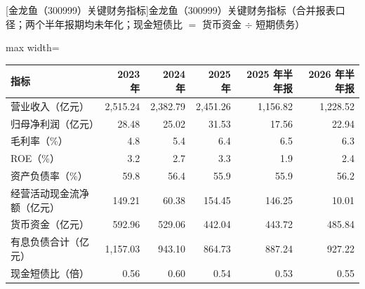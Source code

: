 \begin{center}\small\setlength{\tabcolsep}{3.4pt}
[金龙鱼（300999）关键财务指标]{金龙鱼（300999）关键财务指标（合并报表口径；两个半年报期均未年化；现金短债比 $=$ 货币资金 $\div$ 短期债务）}
\begin{adjustbox}{max width=\textwidth}
\begin{tabular}{@{}lrrrrr@{}}
\toprule
指标 & 2023 年 & 2024 年 & 2025 年 & 2025 年半年报 & 2026 年半年报 \\
\midrule
营业收入（亿元） & 2,515.24 & 2,382.79 & 2,451.26 & 1,156.82 & 1,228.52 \\
归母净利润（亿元） & 28.48 & 25.02 & 31.53 & 17.56 & 22.94 \\
毛利率（\%） & 4.8 & 5.4 & 6.4 & 6.5 & 6.3 \\
ROE（\%） & 3.2 & 2.7 & 3.3 & 1.9 & 2.4 \\
资产负债率（\%） & 59.8 & 56.4 & 55.9 & 55.9 & 56.2 \\
经营活动现金流净额（亿元） & 149.21 & 60.38 & 154.45 & 146.25 & 10.01 \\
货币资金（亿元） & 592.96 & 529.06 & 442.04 & 443.72 & 485.84 \\
有息负债合计（亿元） & 1,157.03 & 943.10 & 864.73 & 887.24 & 927.22 \\
现金短债比（倍） & 0.56 & 0.60 & 0.54 & 0.53 & 0.55 \\
\bottomrule
\end{tabular}
\end{adjustbox}
\end{center}

